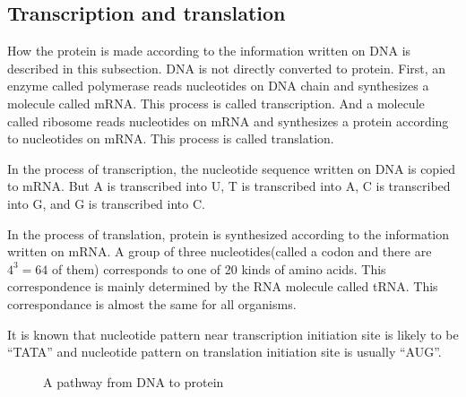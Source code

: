 \subsection{Transcription and translation}
How the protein is made according to the information written on DNA is
described in this subsection.
DNA is not directly converted to protein.
First, an enzyme called polymerase reads nucleotides on DNA chain  
 and synthesizes a molecule called mRNA. This process
is called transcription.
And a molecule called ribosome reads nucleotides on mRNA and
synthesizes a protein according to nucleotides on mRNA. 
This process is called translation.

In the process of transcription, the nucleotide sequence written on 
DNA is copied to
mRNA. But A is transcribed into U, T is transcribed into A, 
C is transcribed into G, and G is transcribed into C. 

In the process of translation, protein is synthesized according to the 
information written on mRNA. A group of three nucleotides(called a codon
and there are \(4^{3}=64\) of them)
 corresponds to one of 20 kinds of amino acids. This correspondence is
mainly determined by the RNA molecule called tRNA. This correspondance
is almost the same for all organisms.

It is known that nucleotide pattern near transcription
initiation site is likely to be ``TATA'' and nucleotide pattern on
translation initiation site is usually ``AUG''.


\begin{figure}
\begin{center}
\end{center}
\caption{A pathway from DNA to protein}

\end{figure}